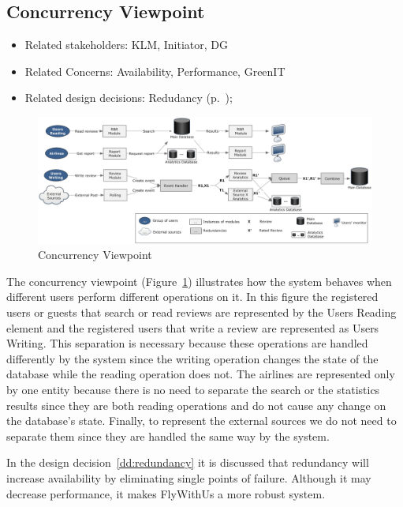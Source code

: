 % 

\subsection{Concurrency Viewpoint}

\begin{itemize}
\item Related stakeholders: KLM, Initiator, DG
\item Related Concerns: Availability, Performance, GreenIT
\item Related design decisions: Redudancy (p.~\pageref{dd:redundancy});
\end{itemize}

\newpage
\begin{landscape}
\begin{figure}
\includegraphics[width=600px]{ConcurrencyViewpoint.jpg}
\caption{Concurrency Viewpoint}
\label{fig:concurrency}
\end{figure}
\end{landscape}

The concurrency viewpoint (Figure~\ref{fig:concurrency}) illustrates how the system behaves when different users perform different operations on it. In this figure the registered users or guests that search or read reviews are represented by the Users Reading element and the registered users that write a  review are represented as Users Writing. This separation is necessary because these operations are handled differently by the system since the writing operation changes the state of the database while the reading operation does not. The airlines are represented only by one entity because there is no need to separate the search or the statistics results since they are both reading operations and do not cause any change on the database's state. Finally, to represent the external sources we do not need to separate them since they are handled the same way by the system.

In the design decision~\ref{dd:redundancy} it is discussed that redundancy will increase availability by eliminating single points of failure. Although it may decrease performance, it makes FlyWithUs a more robust system. 

